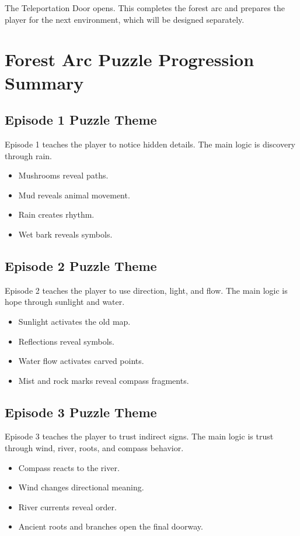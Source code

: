 \documentclass[12pt]{article}
\begin{document}
The Teleportation Door opens. This completes the forest arc and prepares the player for the next environment, which will be designed separately.

\section{Forest Arc Puzzle Progression Summary}

\subsection{Episode 1 Puzzle Theme}

Episode 1 teaches the player to notice hidden details. The main logic is discovery through rain.

\begin{itemize}[leftmargin=*]
    \item Mushrooms reveal paths.
    \item Mud reveals animal movement.
    \item Rain creates rhythm.
    \item Wet bark reveals symbols.
\end{itemize}

\subsection{Episode 2 Puzzle Theme}

Episode 2 teaches the player to use direction, light, and flow. The main logic is hope through sunlight and water.

\begin{itemize}[leftmargin=*]
    \item Sunlight activates the old map.
    \item Reflections reveal symbols.
    \item Water flow activates carved points.
    \item Mist and rock marks reveal compass fragments.
\end{itemize}

\subsection{Episode 3 Puzzle Theme}

Episode 3 teaches the player to trust indirect signs. The main logic is trust through wind, river, roots, and compass behavior.

\begin{itemize}[leftmargin=*]
    \item Compass reacts to the river.
    \item Wind changes directional meaning.
    \item River currents reveal order.
    \item Ancient roots and branches open the final doorway.
\end{itemize}
\end{document}
